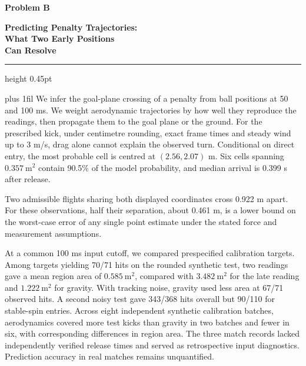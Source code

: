 \documentclass[11pt,letterpaper]{article}
\renewenvironment{abstract}
  {\par\noindent{\large\bfseries\color{black}Abstract}\par\vspace{5pt}\noindent\ignorespaces}
  {\par}
\begin{document}
\thispagestyle{cover}
\vspace*{0.60in}
\begin{center}
\begin{minipage}{0.89\textwidth}
\raggedright
{\large\sffamily\bfseries\color{black}Problem B\par}
\vspace{0.25in}
{\fontsize{25}{30}\selectfont\bfseries\color{black}
 Predicting Penalty Trajectories:\\
 What Two Early Positions\\
 Can Resolve\par}
\vspace{0.28in}
{\color{coverrule}\hrule height 0.45pt}
\vspace{0.24in}
\begin{abstract}
\leftskip=0pt \rightskip=0pt \parfillskip=0pt plus 1fil
We infer the goal-plane crossing of a penalty from ball positions at 50 and 100 ms. We weight aerodynamic trajectories by how well they reproduce the readings, then propagate them to the goal plane or the ground. For the prescribed kick, under centimetre rounding, exact frame times and steady wind up to 3 m/s, drag alone cannot explain the observed turn. Conditional on direct entry, the most probable cell is centred at \((2.56,2.07)\) m. Six cells spanning \(0.357\ \mathrm{m^2}\) contain 90.5\% of the model probability, and median arrival is 0.399 s after release.

Two admissible flights sharing both displayed coordinates cross 0.922 m apart. For these observations, half their separation, about 0.461 m, is a lower bound on the worst-case error of any single point estimate under the stated force and measurement assumptions.

At a common 100 ms input cutoff, we compared prespecified calibration targets. Among targets yielding 70/71 hits on the rounded synthetic test, two readings gave a mean region area of \(0.585\ \mathrm{m^2}\), compared with \(3.482\ \mathrm{m^2}\) for the late reading and \(1.222\ \mathrm{m^2}\) for gravity. With tracking noise, gravity used less area at 67/71 observed hits. A second noisy test gave 343/368 hits overall but 90/110 for stable-spin entries. Across eight independent synthetic calibration batches, aerodynamics covered more test kicks than gravity in two batches and fewer in six, with corresponding differences in region area. The three match records lacked independently verified release times and served as retrospective input diagnostics. Prediction accuracy in real matches remains unquantified.

\end{abstract}
\end{minipage}
\end{center}
\clearpage
\end{document}
